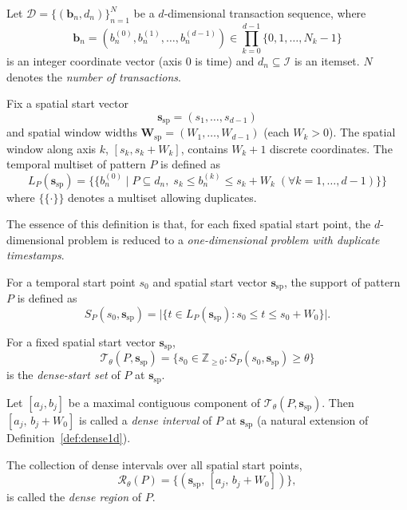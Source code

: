 Let $\mathcal{D} = \{(\bm{b}_n, d_n)\}_{n=1}^N$
be a $d$-dimensional transaction sequence, where
\[
  \bm{b}_n = (b_n^{(0)}, b_n^{(1)}, \ldots, b_n^{(d-1)})
  \in \prod_{k=0}^{d-1}\{0,1,\ldots,N_k-1\}
\]
is an integer coordinate vector (axis 0 is time) and
$d_n \subseteq \mathcal{I}$ is an itemset.
$N$ denotes the \emph{number of transactions}.

\begin{definition}\label{def:collapsed_multiset_nd}
Fix a spatial start vector
\[
  \bm{s}_{\mathrm{sp}} = (s_1, \ldots, s_{d-1})
\]
and spatial window widths
$\bm{W}_{\mathrm{sp}} = (W_1, \ldots, W_{d-1})$
(each $W_k > 0$).
The spatial window along axis $k$, $[s_k, s_k + W_k]$,
contains $W_k + 1$ discrete coordinates.
The temporal multiset of pattern $P$ is defined as
\[
  L_P(\bm{s}_{\mathrm{sp}})
  =
  \{\!\{
    b_n^{(0)}
    \mid
    P \subseteq d_n,\;
    s_k \leq b_n^{(k)} \leq s_k + W_k\; (\forall k=1,\ldots,d-1)
  \}\!\}
\]
where $\{\!\{\cdot\}\!\}$ denotes a multiset allowing duplicates.
\end{definition}

The essence of this definition is that,
for each fixed spatial start point,
the $d$-dimensional problem is reduced to
a \emph{one-dimensional problem with duplicate timestamps}.

\begin{definition}\label{def:support_nd}
For a temporal start point $s_0$ and spatial start vector
$\bm{s}_{\mathrm{sp}}$,
the support of pattern $P$ is defined as
\begin{equation}\label{eq:support_nd}
  S_P(s_0, \bm{s}_{\mathrm{sp}})
  = \bigl|\{t \in L_P(\bm{s}_{\mathrm{sp}}) : s_0 \leq t \leq s_0 + W_0\}\bigr|.
\end{equation}
\end{definition}

\begin{definition}\label{def:dense_region_nd}
For a fixed spatial start vector $\bm{s}_{\mathrm{sp}}$,
\[
  \mathcal{T}_\theta(P,\bm{s}_{\mathrm{sp}})
  =
  \{s_0 \in \mathbb{Z}_{\geq 0} : S_P(s_0,\bm{s}_{\mathrm{sp}}) \geq \theta\}
\]
is the \emph{dense-start set} of $P$
at $\bm{s}_{\mathrm{sp}}$.

Let $[a_j,b_j]$ be a maximal contiguous component
of $\mathcal{T}_\theta(P,\bm{s}_{\mathrm{sp}})$.
Then $[a_j,\, b_j + W_0]$ is called a \emph{dense interval} of $P$
at $\bm{s}_{\mathrm{sp}}$
(a natural extension of Definition~\ref{def:dense1d}).

The collection of dense intervals over all spatial start points,
\[
  \mathcal{R}_\theta(P)
  = \{(\bm{s}_{\mathrm{sp}},\, [a_j,\, b_j + W_0])\},
\]
is called the \emph{dense region} of $P$.
\end{definition}

